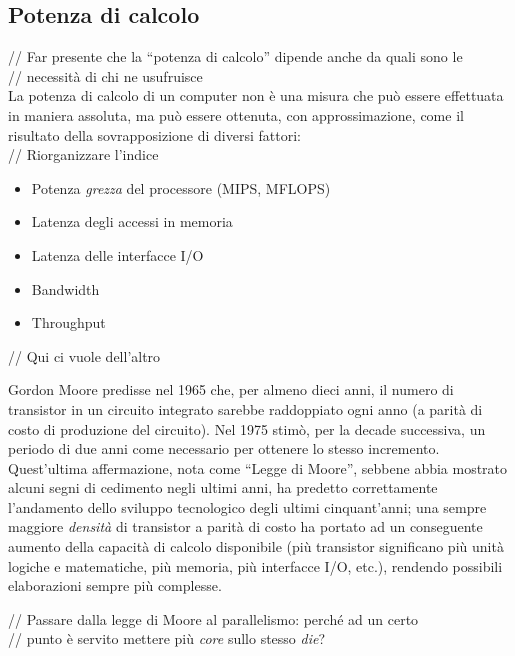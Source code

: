 \subsection{Potenza di calcolo}
// Far presente che la ``potenza di calcolo'' dipende anche da quali sono le \\
// necessità di chi ne usufruisce \\
La potenza di calcolo di un computer non è una misura che può essere effettuata
in maniera assoluta, ma può essere ottenuta, con approssimazione, come il 
risultato della sovrapposizione di diversi fattori:\\
// Riorganizzare l'indice
\begin{itemize}
\item Potenza \emph{grezza} del processore (MIPS, MFLOPS)
\item Latenza degli accessi in memoria
\item Latenza delle interfacce I/O
\item Bandwidth
\item Throughput
\end{itemize}


// Qui ci vuole dell'altro

Gordon Moore predisse nel 1965\citep{GMoore} che, 
per almeno dieci anni, il numero di transistor in un circuito integrato 
sarebbe raddoppiato ogni anno (a parità di costo di produzione del circuito).
 Nel 1975 stimò, per la decade successiva, un periodo di due anni come 
necessario per ottenere lo stesso incremento. Quest'ultima affermazione, 
nota come ``Legge di Moore'', sebbene abbia mostrato alcuni segni di
cedimento negli ultimi anni\citep{MooresLaw}, ha 
predetto correttamente l'andamento dello sviluppo tecnologico degli ultimi
cinquant'anni; una sempre maggiore \emph{densità} di transistor a parità
di costo ha portato ad un conseguente aumento della capacità di calcolo 
disponibile (più transistor significano più unità logiche e matematiche,
più memoria, più interfacce I/O, etc.), rendendo possibili elaborazioni
sempre più complesse.

// Passare dalla legge di Moore al parallelismo: perché ad un certo \\
// punto è servito mettere più \emph{core} sullo stesso \emph{die}?

